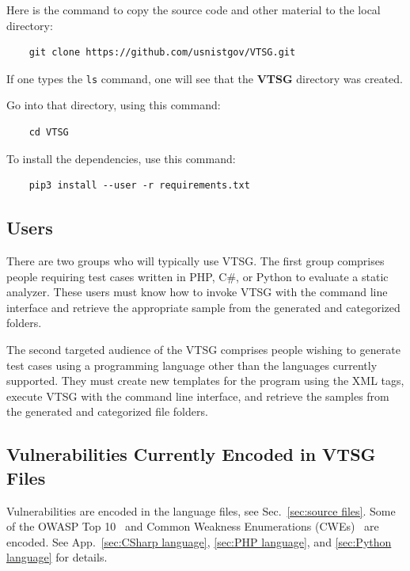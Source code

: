 \documentclass[12pt]{article}
\newcommand{\CSharp}{C{\fontseries{b}\selectfont\#}}
\begin{document}
\noindent Here is the command to copy the source code and other material to the local
directory:

\begin{verbatim}
    git clone https://github.com/usnistgov/VTSG.git
\end{verbatim}

\noindent If one types the \verb|ls| command, one will see that the \textbf{VTSG}
directory was created.

\noindent Go into that directory, using this command:

\begin{verbatim}
    cd VTSG
\end{verbatim}

\noindent To install the dependencies, use this command:

\begin{verbatim}
    pip3 install --user -r requirements.txt
\end{verbatim}


\subsection{Users}

There are two groups who will typically use VTSG. The first group comprises people
requiring test cases written in PHP, \CSharp, or Python to evaluate a static
analyzer. These users must know how to invoke VTSG with the command line interface
and retrieve the appropriate sample from the generated and categorized folders.

The second targeted audience of the VTSG comprises people wishing to generate
test cases using a programming language other than the languages currently
supported.  They must create new templates for the program
using the XML tags, execute VTSG with the command line interface,
and retrieve the samples from the generated and categorized file folders.

\subsection{Vulnerabilities Currently Encoded in VTSG Files}

Vulnerabilities are encoded in the language files, see Sec.~\ref{sec:source files}.
Some of the OWASP Top 10~\cite{OWASPTop10-2017} and
Common Weakness Enumerations (CWEs)~\cite{CWE} are encoded.
See App.~\ref{sec:CSharp language}, \ref{sec:PHP language}, and
\ref{sec:Python language} for details.
\end{document}

